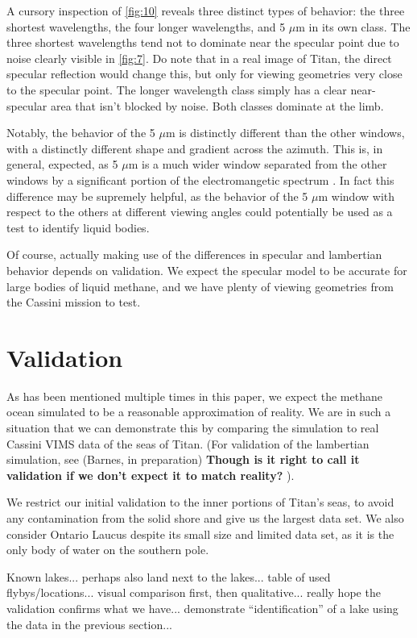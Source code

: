\documentclass[twocolumn,linenumbers]{aastex631}
\begin{document}
A cursory inspection of \ref{fig:10} reveals three distinct types of behavior: the three shortest wavelengths, the four longer wavelengths, and 5 $\mu$m in its own class. The three shortest wavelengths tend not to dominate near the specular point due to noise clearly visible in \ref{fig:7}. Do note that in a real image of Titan, the direct specular reflection would change this, but only for viewing geometries very close to the specular point. The longer wavelength class simply has a clear near-specular area that isn't blocked by noise. Both classes dominate at the limb. 

Notably, the behavior of the 5 $\mu$m is distinctly different than the other windows, with a distinctly different shape and gradient across the azimuth. This is, in general, expected, as 5 $\mu$m is a much wider window separated from the other windows by a significant portion of the electromangetic spectrum \citep{EsSayeh2023}. In fact this difference may be supremely helpful, as the behavior of the 5 $\mu$m window with respect to the others at different viewing angles could potentially be used as a test to identify liquid bodies. 

Of course, actually making use of the differences in specular and lambertian behavior depends on validation. We expect the specular model to be accurate for large bodies of liquid methane, and we have plenty of viewing geometries from the Cassini mission to test.

\section{Validation} \label{sec:validation}

As has been mentioned multiple times in this paper, we expect the methane ocean simulated to be a reasonable approximation of reality. We are in such a situation that we can demonstrate this by comparing the simulation to real Cassini VIMS data of the seas of Titan. (For validation of the lambertian simulation, see (Barnes, in preparation) \textbf{\color{red} Though is it right to call it validation if we don't expect it to match reality? \color{black}}). 

We restrict our initial validation to the inner portions of Titan's seas, to avoid any contamination from the solid shore and give us the largest data set. We also consider Ontario Laucus despite its small size and limited data set, as it is the only body of water on the southern pole. 

\color{blue}Known lakes... perhaps also land next to the lakes... table of used flybys/locations... visual comparison first, then qualitative... really hope the validation confirms what we have... demonstrate ``identification'' of a lake using the data in the previous section... \color{black}
\end{document}

